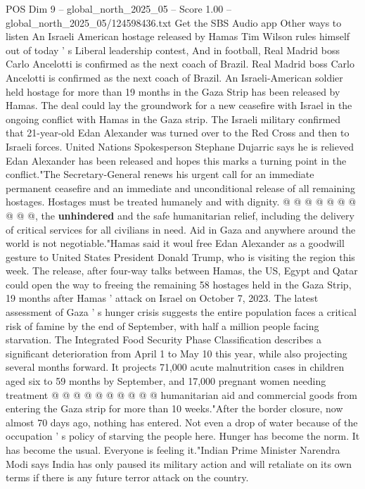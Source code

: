 \begin{textsample}{POS Dim 9 – global\_north\_2025\_05 – Score 1.00 – global\_north\_2025\_05/124598436.txt}  \label{ex:f9_pos_369}
Get the SBS Audio app Other ways to listen An Israeli American hostage released by Hamas Tim Wilson rules himself out of today ' s Liberal leadership contest, And in football, Real Madrid boss Carlo Ancelotti is confirmed as the next coach of Brazil.
Real Madrid boss Carlo Ancelotti is confirmed as the next coach of Brazil.
An Israeli-American soldier held hostage for more than 19 months in the Gaza Strip has been released by Hamas.
The deal could lay the groundwork for a new ceasefire with Israel in the ongoing conflict with Hamas in the Gaza strip.
The Israeli military confirmed that 21-year-old Edan Alexander was turned over to the Red Cross and then to Israeli forces.
United Nations Spokesperson Stephane Dujarric says he is relieved Edan Alexander has been released and hopes this marks a turning point in the conflict."The Secretary-General renews his urgent call for an immediate permanent ceasefire and an immediate and unconditional release of all remaining hostages.
Hostages must be treated humanely and with dignity. @ @ @ @ @ @ @ @ @ @, the \textbf{unhindered} and the safe humanitarian relief, including the delivery of critical services for all civilians in need.
Aid in Gaza and anywhere around the world is not negotiable."Hamas said it woul free Edan Alexander as a goodwill gesture to United States President Donald Trump, who is visiting the region this week.
The release, after four-way talks between Hamas, the US, Egypt and Qatar could open the way to freeing the remaining 58 hostages held in the Gaza Strip, 19 months after Hamas ' attack on Israel on October 7, 2023.
The latest assessment of Gaza ' s hunger crisis suggests the entire population faces a critical risk of famine by the end of September, with half a million people facing starvation.
The Integrated Food Security Phase Classification describes a significant deterioration from April 1 to May 10 this year, while also projecting several months forward.
It projects 71,000 acute malnutrition cases in children aged six to 59 months by September, and 17,000 pregnant women needing treatment @ @ @ @ @ @ @ @ @ @ humanitarian aid and commercial goods from entering the Gaza strip for more than 10 weeks."After the border closure, now almost 70 days ago, nothing has entered.
Not even a drop of water because of the occupation ' s policy of starving the people here.
Hunger has become the norm.
It has become the usual.
Everyone is feeling it."Indian Prime Minister Narendra Modi says India has only paused its military action and will retaliate on its own terms if there is any future terror attack on the country.

\end{textsample}
